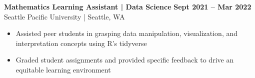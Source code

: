 \textbf{Mathematics Learning Assistant | Data Science} \hfill \textbf{Sept 2021 -- Mar 2022} \\
    Seattle Pacific University | Seattle, WA
    \squish
    \begin{itemize}
        \item Assisted peer students in grasping data manipulation, visualization, and interpretation concepts using R's {tidyverse}
        \item Graded student assignments and provided specific feedback to drive an equitable learning environment
    \end{itemize}